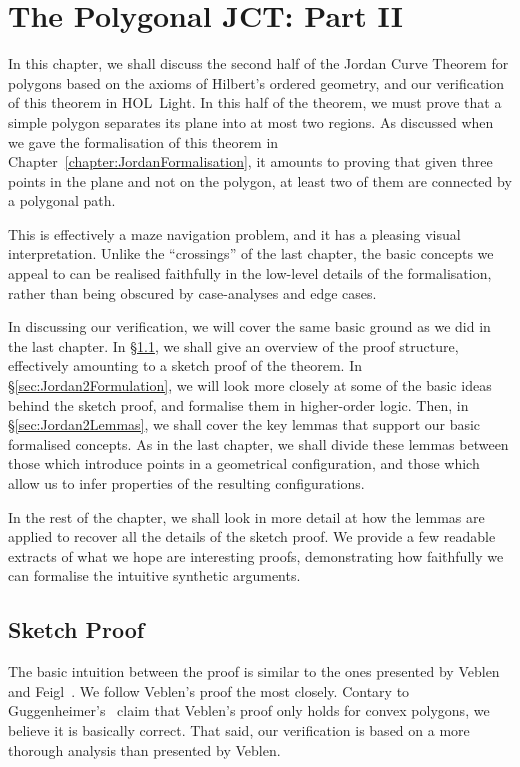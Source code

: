 \chapter{The Polygonal JCT: Part II}\label{chapter:JordanVerification2}
In this chapter, we shall discuss the second half of the Jordan Curve Theorem for polygons based on the axioms of Hilbert's ordered geometry, and our verification of this theorem in HOL~Light. In this half of the theorem, we must prove that a simple polygon separates its plane into at most two regions. As discussed when we gave the formalisation of this theorem in Chapter~\ref{chapter:JordanFormalisation}, it amounts to proving that given three points in the plane and not on the polygon, at least two of them are connected by a polygonal path.

This is effectively a maze navigation problem, and it has a pleasing visual interpretation. Unlike the ``crossings'' of the last chapter, the basic concepts we appeal to can be realised faithfully in the low-level details of the formalisation, rather than being obscured by case-analyses and edge cases. 

In discussing our verification, we will cover the same basic ground as we did in the last chapter. In \S\ref{sec:SketchProofJordan2}, we shall give an overview of the proof structure, effectively amounting to a sketch proof of the theorem. In \S\ref{sec:Jordan2Formulation}, we will look more closely at some of the basic ideas behind the sketch proof, and formalise them in higher-order logic. Then, in \S\ref{sec:Jordan2Lemmas}, we shall cover the key lemmas that support our basic formalised concepts. As in the last chapter, we shall divide these lemmas between those which introduce points in a geometrical configuration, and those which allow us to infer properties of the resulting configurations. 

In the rest of the chapter, we shall look in more detail at how the lemmas are applied to recover all the details of the sketch proof. We provide a few readable extracts of what we hope are interesting proofs, demonstrating how faithfully we can formalise the intuitive synthetic arguments.

\section{Sketch Proof}\label{sec:SketchProofJordan2}
The basic intuition between the proof is similar to the ones presented by Veblen~\cite{Veblenphd} and Feigl~\cite{FeiglJordan}. We follow Veblen's proof the most closely. Contary to Guggenheimer's~\cite{GuggenheimerJordanCurve} claim that Veblen's proof only holds for convex polygons, we believe it is basically correct. That said, our verification is based on a more thorough analysis than presented by Veblen.

